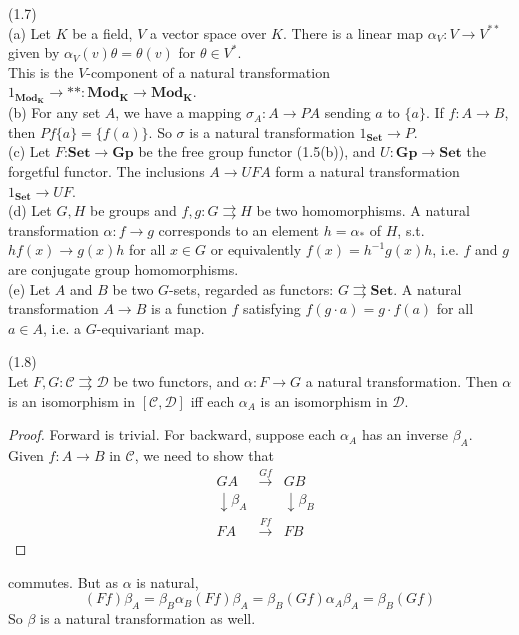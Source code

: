 \documentclass[a4paper]{article}
\begin{document}
\begin{eg} (1.7)\\
    (a) Let $K$ be a field, $V$ a vector space over $K$. There is a linear map $\alpha_V : V \to V^{**}$ given by $\alpha_V (v) \theta = \theta(v)$ for $\theta \in V^*$.\\
    This is the $V$-component of a natural transformation $1_{\mathbf{Mod_K}} \to **: \mathbf{Mod_K} \to \mathbf{Mod_K}$.\\
    (b) For any set $A$, we have a mapping $\sigma_A:A \to PA$ sending $a$ to $\{a\}$. If $f:A \to B$, then $Pf\{a\} = \{f(a)\}$. So $\sigma$ is a natural transformation $1_{\mathbf{Set}} \to P$.\\
    (c) Let $F$:$\mathbf{Set} \to \mathbf{Gp}$ be the free group functor (1.5(b)), and $U: \mathbf{Gp} \to \mathbf{Set}$ the forgetful functor. The inclusions $A \to UFA$ form a natural transformation $1_{\mathbf{Set}} \to UF$.\\
    (d) Let $G,H$ be groups and $f,g: G \rightrightarrows H$ be two homomorphisms. A natural transformation $\alpha: f \to g$ corresponds to an element $h=\alpha_*$ of $H$, s.t. $h f(x) \to g(x) h$ for all $x \in G$ or equivalently $f(x) = h^{-1} g(x) h$, i.e. $f$ and $g$ are conjugate group homomorphisms.\\
    (e) Let $A$ and $B$ be two $G$-sets, regarded as functors: $G \rightrightarrows \mathbf{Set}$. A natural transformation $A \to B$ is a function $f$ satisfying $f(g\cdot a) = g \cdot f(a)$ for all $a \in A$, i.e. a $G$-equivariant map.
\end{eg}

\begin{lemma} (1.8)\\
    Let $F,G: \mathcal{C} \rightrightarrows \mathcal{D}$ be two functors, and $\alpha: F \to G$ a natural transformation. Then $\alpha$ is an isomorphism in $[\mathcal{C},\mathcal{D}]$ iff each $\alpha_A$ is an isomorphism in $\mathcal{D}$.
    \begin{proof}
        Forward is trivial. For backward, suppose each $\alpha_A$ has an inverse $\beta_A$. Given $f:A \to B$ in $\mathcal{C}$, we need to show that 
        \begin{equation*}
            \begin{aligned}
                &GA &\xrightarrow{Gf} &GB\\
                &\downarrow \beta_A & &\downarrow \beta_B\\
                &FA &\xrightarrow{Ff} & FB
            \end{aligned}
        \end{equation*}
    \end{proof}
    commutes. But as $\alpha$ is natural, 
    $$(Ff)\beta_A = \beta_B \alpha_B (Ff)\beta_A = \beta_B (Gf) \alpha_A \beta_A = \beta_B (Gf)$$
    So $\beta$ is a natural transformation as well.
\end{lemma}
\end{document}

